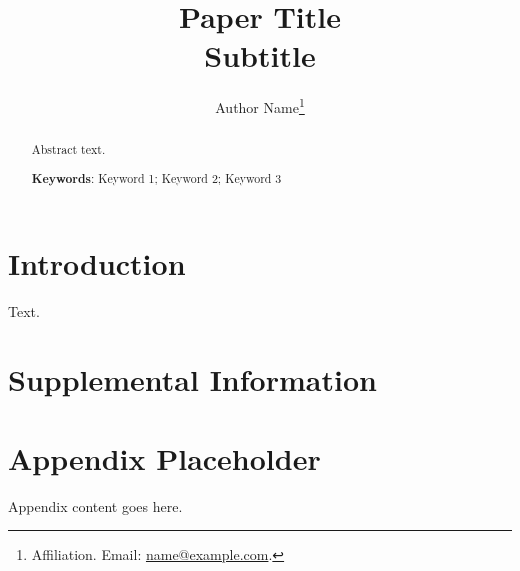 \documentclass[12pt,american]{article}
\title{\textbf{Paper Title}\\
\textbf{Subtitle}}
\author{Author Name\thanks{Affiliation. Email: \href{mailto:name@example.com}{name@example.com}.}}
\date{}
\begin{document}
\hypersetup{pageanchor=false}
\maketitle
\thispagestyle{empty}

\begin{abstract}
\noindent Abstract text.

\vspace{0.15in}
\noindent \textbf{Keywords}: Keyword 1; Keyword 2; Keyword 3
\end{abstract}

\setcounter{page}{0}
\thispagestyle{empty}
\doublespacing
\newpage
\setcounter{page}{1}
\renewcommand{\thepage}{\arabic{page}}
\hypersetup{pageanchor=true}

\section*{Introduction}

Text.

\clearpage
\begingroup
\singlespacing
\setlength\bibitemsep{0pt}
\printbibliography
\endgroup

\newpage
\begin{refsection}

\appendix
\section*{Supplemental Information}
\onehalfspacing
\startcontents[sections]
\thispagestyle{empty}

\newpage
\singlespacing
\hypersetup{pageanchor=false}
\renewcommand{\thepage}{SI-\arabic{page}}
\setcounter{page}{1}
\setcounter{figure}{0}
\setcounter{table}{0}
\setcounter{footnote}{0}

\section{Appendix Placeholder}
Appendix content goes here.

\end{refsection}
\end{document}
